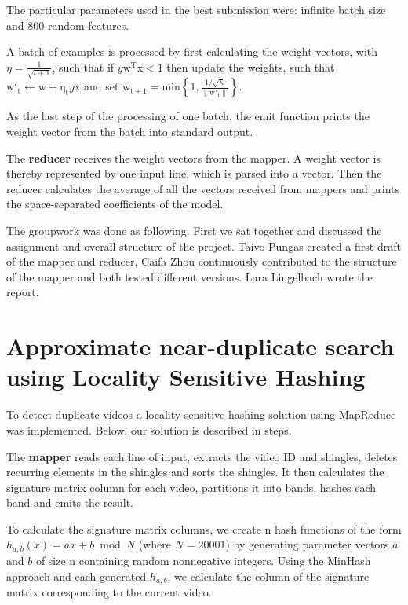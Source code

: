 \documentclass[a4paper, 11pt]{article}
\begin{document}
The particular parameters used in the best submission were: infinite batch size and 800 random features.

A batch of examples is processed by first calculating the weight vectors, with $\eta = \frac{1}{\sqrt{t +1}}$, such that if $y\mathrm{w^{T}x} < 1$ then update the weights, such that $\mathrm{w'_{t}} \leftarrow\mathrm{w + \eta _{t}}y \mathrm{x}$ and set $\mathrm{w_{t+1}} = \mathrm{min \left \{1,\frac{1/\sqrt{\lambda }}{\left \| w'_{t} \right \|} \right \}}$.

As the last step of the processing of one batch, the emit function prints the weight vector from the batch into standard output.

The \textbf{reducer} receives the weight vectors from the mapper. A weight vector is thereby represented by one input line, which is parsed into a vector. Then the reducer calculates the average of all the vectors received from mappers and prints the space-separated coefficients of the model.

The groupwork was done as following. First we sat together and discussed the assignment and overall structure of the project. Taivo Pungas created a first draft of the mapper and reducer, Caifa Zhou continuously contributed to the structure of the mapper and both tested different versions. Lara Lingelbach wrote the report. \pagebreak

\section*{Approximate near-duplicate search using Locality Sensitive Hashing} 

To detect duplicate videos a locality sensitive hashing solution using MapReduce was implemented.
Below, our solution is described in steps.

The \textbf{mapper} reads each line of input, extracts the video ID and shingles, deletes recurring elements in the shingles and sorts the shingles. It then calculates the signature matrix column for each video, partitions it into bands, hashes each band and emits the result.

To calculate the signature matrix columns, we create n hash functions of the form $h_{a,b}(x) = ax + b \bmod N$ (where $N=20001$) by generating parameter vectors $a$ and $b$ of size n containing random nonnegative integers. Using the MinHash approach and each generated $h_{a,b}$, we calculate the column of the signature matrix corresponding to the current video.
\end{document}
